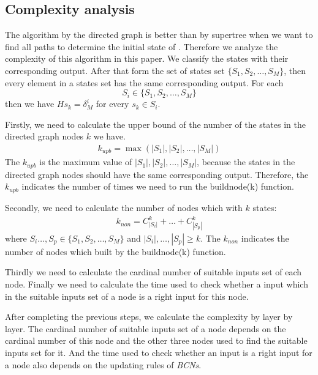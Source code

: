 \subsection{Complexity analysis}
The algorithm by the directed graph is better than by supertree when we want to find all paths to determine the initial state of \BCNs. Therefore we analyze the complexity of this algorithm in this paper. We classify the states with their corresponding output. After that form the set of states set $\{S_1, S_2,\ldots,S_M\}$,  then every element in a states set has the same corresponding output. For each 
\[S_i\in\{S_1, S_2,\ldots,S_M\}\]
 then we have $Hs_k=\delta_{M}^i$ for every $s_k\in S_i$.

Firstly, we need to calculate the upper bound of the number of the states in the directed graph nodes $k$ we have.
\begin{equation}
\begin{split}
k_{upb}= \max(|S_1|,|S_2|,\ldots,|S_M|)
\end{split}
\end{equation}
The $k_{upb}$ is the maximum value of $|S_1|,|S_2|,\ldots,|S_M|$, because the states in the directed graph nodes should have the same corresponding output. Therefore, the $k_{upb}$ indicates the number of times we need to run the {\sf buildnode}(k) function.

Secondly, we need to calculate the number of nodes which with $k$ states:
\begin{equation}
\begin{split}
k_{non}= C_{|S_i|}^k+\ldots +C_{|S_p|}^k
\end{split}
\end{equation}
where $S_i\ldots,S_p\in\{S_1, S_2,\ldots,S_M\}$ and $|S_i|,\ldots,|S_p|\ge k$. The $k_{non}$ indicates the number of nodes which built by the {\sf buildnode}(k) function.

Thirdly we need to calculate the cardinal number of suitable inputs set of each node. Finally we need to calculate the time used to check whether a input which in the suitable inputs set of a node is a right input for this node.

After completing the previous steps, we calculate the complexity by layer by layer. The cardinal number of suitable inputs set of a node depends on the cardinal number of this node and the other three nodes used to find the suitable inputs set for it. And the time used to check whether an input is a right input for a node also depends on the updating rules of {\em BCNs}.

